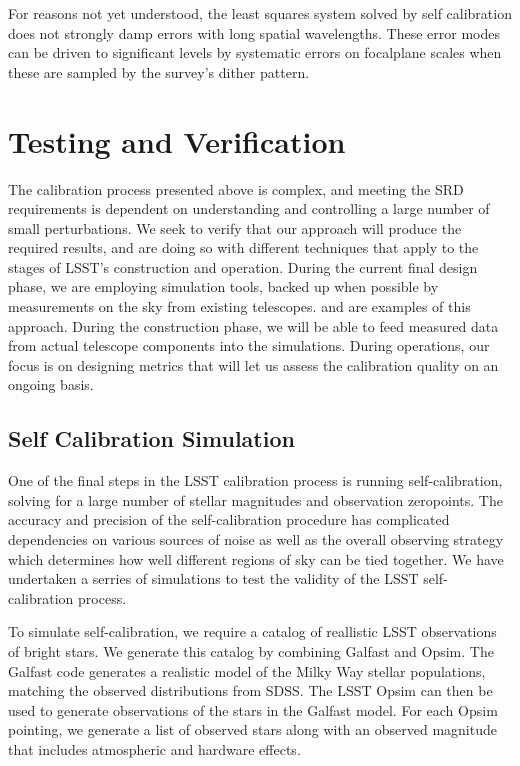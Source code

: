 \documentclass[12pt,preprint]{aastex}
\begin{document}
For reasons not yet understood, the least squares system solved by self calibration does not strongly
damp errors with long spatial wavelengths.  These error modes can be driven to significant levels by
systematic errors on focalplane scales when these are sampled by the survey's dither pattern.

\section{Testing and Verification}
\label{sec:verification}

The calibration process presented above is complex, and meeting the SRD requirements
is dependent on understanding and controlling a large number of small perturbations.  We seek to verify that our approach will produce the required results, and are doing so with different techniques that apply to the stages of LSST's construction and operation.   During the current final design phase, we are employing simulation tools, backed up when possible by measurements on the sky from existing telescopes.   \citep{Burke2013} and \citep{Burke2010b} are examples of this approach.  During the construction phase, we will be able to feed measured data from actual telescope components into the simulations.   During operations, our focus is on designing metrics that will let us assess the calibration quality on an ongoing basis.

\subsection{Self Calibration Simulation}
\label{sec:selfcalsim}

One of the final steps in the LSST calibration process is running self-calibration, solving for a large number of stellar magnitudes and observation zeropoints.  The accuracy and precision of the self-calibration procedure has complicated dependencies on various sources of noise as well as the overall observing strategy which determines how well different regions of sky can be tied together.  We have undertaken a serries of simulations to test the validity of the LSST self-calibration process.

To simulate self-calibration, we require a catalog of reallistic LSST observations of bright stars.  We generate this catalog by combining Galfast and Opsim.  The Galfast code generates a realistic model of the Milky Way stellar populations, matching the observed distributions from SDSS.  The LSST Opsim can then be used to generate observations of the stars in the Galfast model.  For each Opsim pointing, we generate a list of observed stars along with an observed magnitude that includes atmospheric and hardware effects.  
\end{document}
